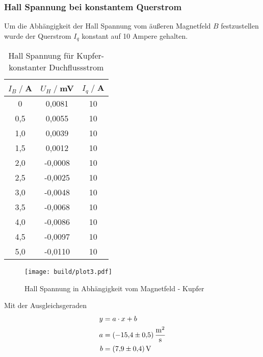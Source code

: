 \subsubsection{Hall Spannung bei konstantem Querstrom}
Um die Abhängigkeit der Hall Spannung vom äußeren Magnetfeld $B$ festzustellen wurde der Querstrom $I_q$ konstant auf 10 Ampere gehalten.
\begin{table}[H]
    \centering
    \begin{tabular}{c c c}
        \toprule
        $I_{B} \;/\;$A & $U_H\;/\;$mV & $I_{q} \;/\;$A\\
        \midrule
        0                   &0,0081              &10\\
        0,5                 &0,0055              &10\\
        1,0                 &0,0039              &10\\
        1,5                 &0,0012              &10\\
        2,0                 &-0,0008             &10\\
        2,5                 &-0,0025             &10\\
        3,0                 &-0,0048             &10\\
        3,5                 &-0,0068             &10\\
        4,0                 &-0,0086             &10\\
        4,5                 &-0,0097             &10\\
        5,0                 &-0,0110             &10\\
        \bottomrule
    \end{tabular}
    \caption{Hall Spannung für Kupfer- konstanter Duchflussstrom}
    \label{tab:Cu_B_b}
\end{table}
\begin{figure}[H]
    \centering
    \texttt{[image: build/plot3.pdf]}
    \caption{Hall Spannung in Abhängigkeit vom Magnetfeld - Kupfer}
    \label{fig:Cu_B}
\end{figure}
Mit der Ausgleichsgeraden
\begin{align*}
    y &= a \cdot x + b\\
    a &=  \SI{-15,4 \pm 0,5 }{\square \meter \per \second}\\
    b &=  \SI{7,9\pm0,4}{\volt}\\
\end{align*}

